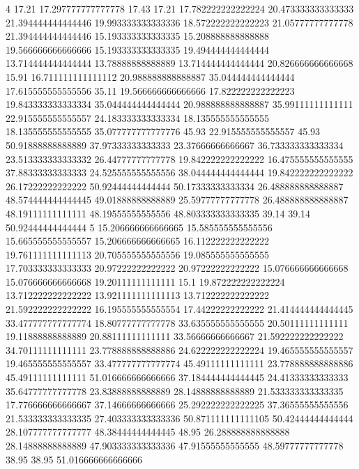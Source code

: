4 17.21 17.297777777777778 17.43 17.21 17.782222222222224 20.473333333333333 21.394444444444446 19.993333333333336 18.572222222222223 21.05777777777778 21.394444444444446 15.193333333333335 15.208888888888888 19.566666666666666 15.193333333333335 19.494444444444444 13.714444444444444 13.78888888888889 13.714444444444444 20.826666666666668 15.91 16.711111111111112 20.988888888888887 35.044444444444444 17.615555555555556 35.11 19.566666666666666 17.822222222222223 19.843333333333334 35.044444444444444 20.988888888888887 35.99111111111111 22.915555555555557 24.183333333333334 18.135555555555555 18.135555555555555 35.077777777777776 45.93 22.915555555555557 45.93 50.91888888888889 37.97333333333333 23.37666666666667 36.733333333333334 23.513333333333332 26.44777777777778 19.842222222222222 16.475555555555555 37.88333333333333 24.525555555555556 38.044444444444444 19.842222222222222 26.17222222222222 50.92444444444444 50.17333333333334 26.488888888888887 48.574444444444445 49.01888888888889 25.59777777777778 26.488888888888887 48.19111111111111 48.19555555555556 48.803333333333335 39.14 39.14 50.92444444444444
5 15.206666666666665 15.585555555555556 15.665555555555557 15.206666666666665 16.112222222222222 19.761111111111113 20.705555555555556 19.085555555555555 17.703333333333333 20.97222222222222 20.97222222222222 15.076666666666668 15.076666666666668 19.20111111111111 15.1 19.872222222222224 13.712222222222222 13.921111111111113 13.712222222222222 21.592222222222222 16.195555555555554 17.44222222222222 21.414444444444445 33.477777777777774 18.80777777777778 33.635555555555555 20.50111111111111 19.11888888888889 20.88111111111111 33.56666666666667 21.592222222222222 34.70111111111111 23.778888888888886 24.622222222222224 19.465555555555557 19.465555555555557 33.477777777777774 45.49111111111111 23.778888888888886 45.49111111111111 51.016666666666666 37.184444444444445 24.41333333333333 35.64777777777778 23.83888888888889 28.14888888888889 21.533333333333335 17.776666666666667 37.14666666666666 25.292222222222225 37.36555555555556 21.533333333333335 27.403333333333336 50.871111111111105 50.42444444444444 28.107777777777777 48.38444444444445 48.95 26.288888888888888 28.14888888888889 47.903333333333336 47.91555555555555 48.59777777777778 38.95 38.95 51.016666666666666
